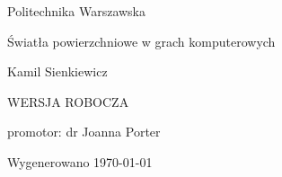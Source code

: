 \documentclass[a4paper]{article}
\begin{document}
\begin{titlepage}
  \centering
  {\Large Politechnika Warszawska\par}
	\vspace{5cm}
  {\LARGE Światła powierzchniowe w grach komputerowych\par}
	\vspace{1.5cm}
  {\large Kamil Sienkiewicz\par}
  \vspace{1.5cm}
  {\LARGE WERSJA ROBOCZA\par}
	\vfill
  {promotor: dr Joanna Porter\par}
  {Wygenerowano \today\par}
\end{titlepage}

\tableofcontents








\end{document}

